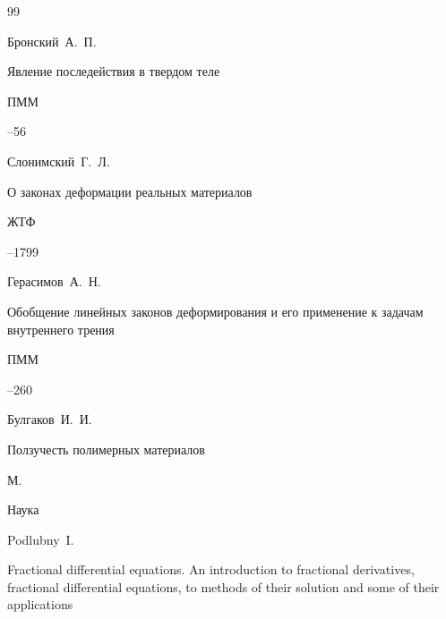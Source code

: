 \documentclass[11pt,a4paper,twoside]{article}
\begin{document}
\begin{thebibliography}{99}


\by Бронский~А.~П.


\paper Явление последействия в твердом теле


\jour ПММ








--56












\by Слонимский~Г.~Л.


\paper О законах деформации реальных материалов


\jour ЖТФ








--1799







\by Герасимов~А.~Н.


\paper Обобщение линейных законов деформирования и его применение к задачам внутреннего трения


\jour  ПММ








--260









\by Булгаков~И.~И.


\book Ползучесть полимерных материалов


\publaddr М.


\publ Наука











\by Podlubny~I.


\book Fractional differential equations. An introduction to fractional derivatives, fractional differential equations, to methods of their solution and some of their applications



\end{thebibliography}
\end{document}
